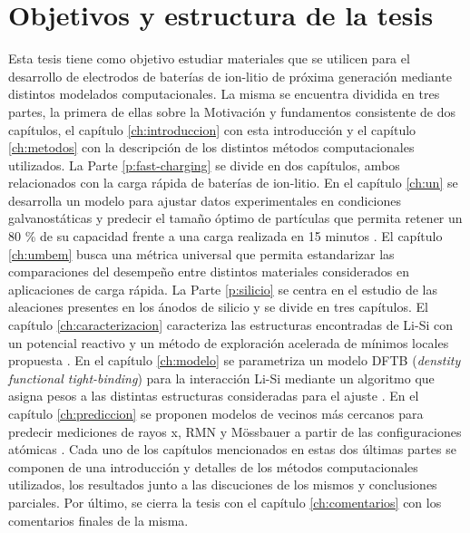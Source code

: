 \section{Objetivos y estructura de la tesis}

Esta tesis tiene como objetivo estudiar materiales que se utilicen para el 
desarrollo de electrodos de baterías de ion-litio de próxima generación mediante 
distintos modelados computacionales. 
La misma se encuentra dividida en tres partes, la primera de ellas sobre la 
Motivación y fundamentos consistente de dos capítulos, el capítulo 
\ref{ch:introduccion} con esta introducción y el capítulo \ref{ch:metodos} con la
descripción de los distintos métodos computacionales utilizados. 
La Parte \ref{p:fast-charging} se divide en dos capítulos, ambos relacionados con 
la carga rápida de baterías de ion-litio. En el capítulo \ref{ch:un} se 
desarrolla un modelo para ajustar datos experimentales en condiciones 
galvanostáticas y predecir el tamaño óptimo de partículas que permita retener un 
80 \% de su capacidad frente a una carga realizada en 15 minutos 
\cite{fernandez2023towards}. El capítulo \ref{ch:umbem} busca una métrica 
universal que permita estandarizar las comparaciones del desempeño entre 
distintos materiales considerados en aplicaciones de carga rápida.
La Parte \ref{p:silicio} se centra en el estudio de las aleaciones presentes en 
los ánodos de silicio y se divide en tres capítulos. El capítulo 
\ref{ch:caracterizacion} caracteriza las estructuras encontradas de Li-Si con 
un potencial reactivo y un método de exploración acelerada de mínimos locales
propuesta \cite{fernandez2021characterization}. En el capítulo \ref{ch:modelo} se
parametriza un modelo DFTB (\textit{denstity functional tight-binding}) para la 
interacción Li-Si mediante un algoritmo que asigna pesos a las distintas 
estructuras consideradas para el ajuste \cite{oviedo2023}. En el capítulo 
\ref{ch:prediccion} se proponen modelos de vecinos más cercanos para predecir 
mediciones de rayos x, RMN y Mössbauer a partir de las configuraciones atómicas
\cite{fernandez2023nmr}.
Cada uno de los capítulos mencionados en estas dos últimas partes se componen
de una introducción y detalles de los métodos computacionales utilizados, los 
resultados junto a las discuciones de los mismos y conclusiones parciales.
Por último, se cierra la tesis con el capítulo \ref{ch:comentarios} con los 
comentarios finales de la misma.
